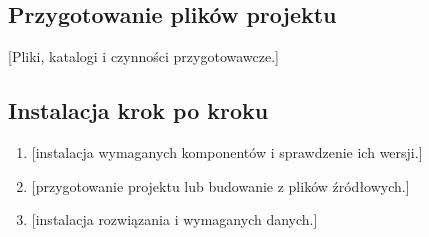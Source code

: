 \documentclass[11pt,a4paper,oneside]{article}
\newif\ifpodpowiedzi
\newcommand{\podpowiedz}[1]{\ifpodpowiedzi\par\begingroup\small\color{hintcolor}\textit{Wskazówka: #1}\par\endgroup\fi}
\newcommand{\pole}[1]{\textnormal{[#1]}}
\begin{document}
\subsection{Przygotowanie plików projektu}
\podpowiedz{Wskaż przekazany pakiet i jego strukturę: kod źródłowy, pliki projektu, zasoby, dane, instalatory lub obrazy kontenerów. Dla projektu programistycznego podaj adres repozytorium oraz identyfikator commitu lub tagu odpowiadającego przekazanemu pakietowi. Dla projektu o innym charakterze wskaż uzgodnione miejsce przechowywania materiałów i oznaczenie wersji plików. Instrukcja powinna umożliwiać pracę z zarchiwizowanym kompletem materiałów; sam odnośnik do repozytorium lub zewnętrznej usługi nie zastępuje przekazania wymaganych plików. Opisz rozpakowanie, rozmieszczenie plików i wymagane przygotowanie danych.}
\pole{Pliki, katalogi i czynności przygotowawcze.}

\subsection{Instalacja krok po kroku}
\podpowiedz{Podaj czynności w kolejności wykonania, z rzeczywistymi poleceniami lub opisem działań w interfejsie. Przy poleceniach wskaż katalog roboczy i wymagane uprawnienia. Opisz budowanie projektu, przygotowanie bazy danych i innych komponentów, jeśli dotyczy. Po istotnych krokach podaj oczekiwany efekt. Poniższe punkty zastąp instrukcją dla własnego projektu.}
\begin{enumerate}
\item \pole{instalacja wymaganych komponentów i sprawdzenie ich wersji.}
\item \pole{przygotowanie projektu lub budowanie z plików źródłowych.}
\item \pole{instalacja rozwiązania i wymaganych danych.}
\end{enumerate}
\end{document}

